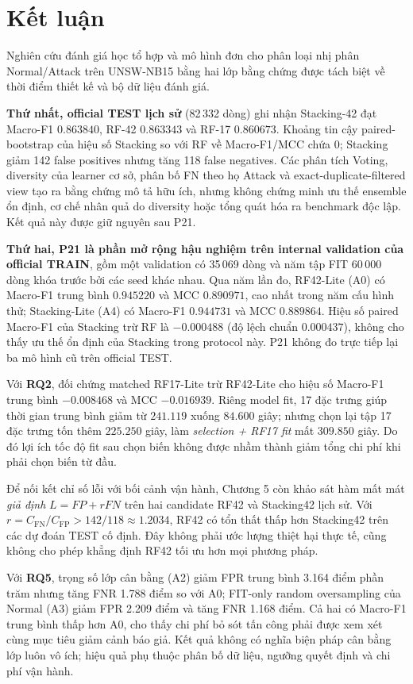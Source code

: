 \section{Kết luận}
\label{chap:ket-luan}
Nghiên cứu đánh giá học tổ hợp và mô hình đơn cho phân loại nhị phân Normal/Attack trên UNSW-NB15 bằng hai lớp bằng chứng được tách biệt về thời điểm thiết kế và bộ dữ liệu đánh giá.

\textbf{Thứ nhất, official TEST lịch sử} (82\,332 dòng) ghi nhận Stacking-42 đạt Macro-F1 $0.863840$, RF-42 $0.863343$ và RF-17 $0.860673$. Khoảng tin cậy paired-bootstrap của hiệu số Stacking so với RF về Macro-F1/MCC chứa 0; Stacking giảm 142 false positives nhưng tăng 118 false negatives. Các phân tích Voting, diversity của learner cơ sở, phân bố FN theo họ Attack và exact-duplicate-filtered view tạo ra bằng chứng mô tả hữu ích, nhưng không chứng minh ưu thế ensemble ổn định, cơ chế nhân quả do diversity hoặc tổng quát hóa ra benchmark độc lập. Kết quả này được giữ nguyên sau P21.

\textbf{Thứ hai, P21 là phần mở rộng hậu nghiệm trên internal validation của official TRAIN}, gồm một validation có 35\,069 dòng và năm tập FIT 60\,000 dòng khóa trước bởi các seed khác nhau. Qua năm lần đo, RF42-Lite (A0) có Macro-F1 trung bình $0.945220$ và MCC $0.890971$, cao nhất trong năm cấu hình thử; Stacking-Lite (A4) có Macro-F1 $0.944731$ và MCC $0.889864$. Hiệu số paired Macro-F1 của Stacking trừ RF là $-0.000488$ (độ lệch chuẩn $0.000437$), không cho thấy ưu thế ổn định của Stacking trong protocol này. P21 không đo trực tiếp lại ba mô hình cũ trên official TEST.

Với \textbf{RQ2}, đối chứng matched RF17-Lite trừ RF42-Lite cho hiệu số Macro-F1 trung bình $-0.008468$ và MCC $-0.016939$. Riêng model fit, 17 đặc trưng giúp thời gian trung bình giảm từ $241.119$ xuống $84.600$ giây; nhưng chọn lại tập 17 đặc trưng tốn thêm $225.250$ giây, làm \emph{selection + RF17 fit} mất $309.850$ giây. Do đó lợi ích tốc độ fit sau chọn biến không được nhầm thành giảm tổng chi phí khi phải chọn biến từ đầu.

Để nối kết chỉ số lỗi với bối cảnh vận hành, Chương 5 còn khảo sát hàm mất mát \emph{giả định} $L=FP+rFN$ trên hai candidate RF42 và Stacking42 lịch sử. Với $r=C_{\mathrm{FN}}/C_{\mathrm{FP}}>142/118\approx1.2034$, RF42 có tổn thất thấp hơn Stacking42 trên các dự đoán TEST cố định. Đây không phải ước lượng thiệt hại thực tế, cũng không cho phép khẳng định RF42 tối ưu hơn mọi phương pháp.

Với \textbf{RQ5}, trọng số lớp cân bằng (A2) giảm FPR trung bình 3.164 điểm phần trăm nhưng tăng FNR 1.788 điểm so với A0; FIT-only random oversampling của Normal (A3) giảm FPR 2.209 điểm và tăng FNR 1.168 điểm. Cả hai có Macro-F1 trung bình thấp hơn A0, cho thấy chi phí bỏ sót tấn công phải được xem xét cùng mục tiêu giảm cảnh báo giả. Kết quả không có nghĩa biện pháp cân bằng lớp luôn vô ích; hiệu quả phụ thuộc phân bố dữ liệu, ngưỡng quyết định và chi phí vận hành.

